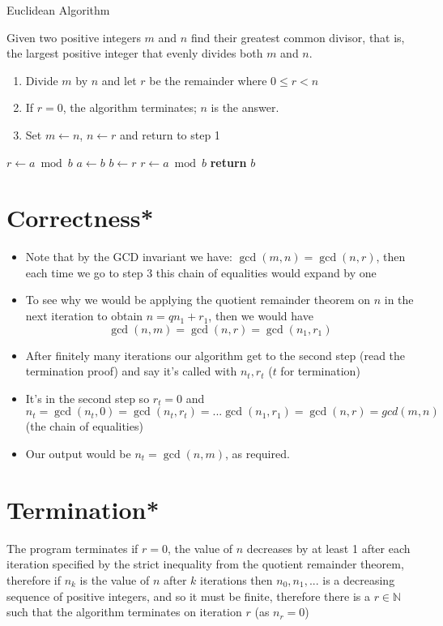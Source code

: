 \documentclass{standalone}
\begin{document}
\begin{defn*}{Euclidean Algorithm}

Given two positive integers $m$ and $n$ find their greatest common divisor, that is, the largest positive integer that evenly divides both $m$ and $n$.

\begin{enumerate}
  \item Divide $m$ by $n$ and let $r$ be the remainder where $0 \le r < n$
  \item If $r =0$, the algorithm terminates; $n$ is the answer.
  \item Set $m \leftarrow n$, $n \leftarrow r$ and return to step 1
\end{enumerate}

\begin{algorithmic}[1]
  \State $r\gets a\bmod b$
  \State $a\gets b$
  \State $b\gets r$
  \State $r\gets a\bmod b$
  \EndWhile\label{euclidendwhile}
  \State \textbf{return} $b$
  \EndProcedure
\end{algorithmic}

\section{Correctness*}
\begin{pf}
  \begin{itemize}
    \item Note that by the GCD invariant we have: $\gcd(m,n) = \gcd(n,r)$, then each time we go to step 3 this chain of equalities would expand by one
    \item To see why we would be applying the quotient remainder theorem on $n$ in the next iteration to obtain $n = q n_1 + r_1$, then we would have 
    \[
      \gcd(n,m) = \gcd(n,r) = \gcd(n_1, r_1)
    \]
    \item After finitely many iterations our algorithm get to the second step (read the termination proof) and say it's called with $n_t, r_t$ ($t$ for termination)
    \item It's in the second step so  $r_t = 0$ and $n_t = \gcd(n_t,0) = \gcd(n_t, r_t) = ... \gcd(n_1, r_1) = \gcd(n, r) = gcd(m,n)$ (the chain of equalities) 
    \item Our output would be $n_t = \gcd(n,m)$, as required.
  \end{itemize}
\end{pf}

\section{Termination*}

The program terminates if $r = 0$, the value of $n$ decreases by at least 1 after each iteration specified by the strict inequality from the quotient remainder theorem, therefore if $n_k$ is the value of $n$ after $k$ iterations then $n_0, n_1, ...$ is a decreasing sequence of positive integers, and so it must be finite, therefore there is a $r \in \mathbb{N}$ such that the algorithm terminates on iteration $r$ (as $n_r = 0$)

\end{defn*}
\end{document}
